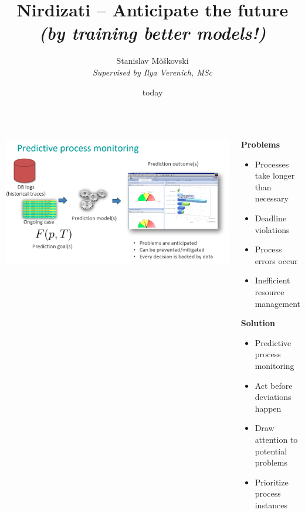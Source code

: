 \documentclass[24pt, a0paper, landscape]{tikzposter}
\title{Nirdizati -- Anticipate the future {\LARGE \textit{(by training better models!)}} }
\author{Stanislav Mõškovski\\{\small \textit{Supervised by Ilya Verenich, MSc}}}
\date{today}
\institute{Institute of Computer Science, University of Tartu}
\begin{document}
    \maketitle

    \begin{columns}
        \block{}
        {
        \begin{tikzfigure}
            \includegraphics[scale=0.9]{figures/ppm.png}
        \end{tikzfigure}
        }

        \block{}
        {

        \begin{multicols}{2}
            {\huge\textbf{Problems}}
            \bigskip

            \begin{itemize}
                \item Processes take longer than necessary
                \item Deadline violations
                \item Process errors occur
                \item Inefficient resource management
            \end{itemize}
            \columnbreak

            {\huge\textbf{Solution}}
            \bigskip
            \begin{itemize}
                \item Predictive process monitoring
                \item Act before deviations happen
                \item Draw attention to potential problems
                \item Prioritize process instances
            \end{itemize}


\end{multicols}}
\end{columns}
\end{document}
